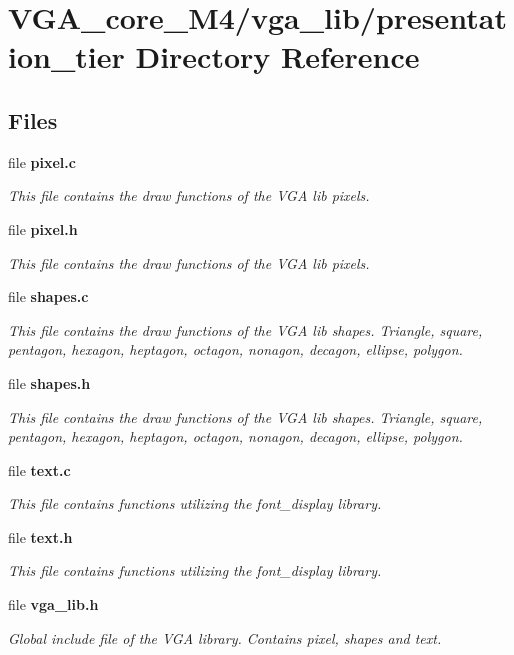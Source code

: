 \section{V\+G\+A\+\_\+core\+\_\+\+M4/vga\+\_\+lib/presentation\+\_\+tier Directory Reference}
\label{dir_4530e91959babd00a8d42e18034e9737}
\subsection*{Files}
\begin{DoxyCompactItemize}
\item 
file {\bf pixel.\+c}
\begin{DoxyCompactList}\small\item\em This file contains the draw functions of the V\+GA lib pixels. \end{DoxyCompactList}\item 
file {\bf pixel.\+h}
\begin{DoxyCompactList}\small\item\em This file contains the draw functions of the V\+GA lib pixels. \end{DoxyCompactList}\item 
file {\bf shapes.\+c}
\begin{DoxyCompactList}\small\item\em This file contains the draw functions of the V\+GA lib shapes. Triangle, square, pentagon, hexagon, heptagon, octagon, nonagon, decagon, ellipse, polygon. \end{DoxyCompactList}\item 
file {\bf shapes.\+h}
\begin{DoxyCompactList}\small\item\em This file contains the draw functions of the V\+GA lib shapes. Triangle, square, pentagon, hexagon, heptagon, octagon, nonagon, decagon, ellipse, polygon. \end{DoxyCompactList}\item 
file {\bf text.\+c}
\begin{DoxyCompactList}\small\item\em This file contains functions utilizing the font\+\_\+display library. \end{DoxyCompactList}\item 
file {\bf text.\+h}
\begin{DoxyCompactList}\small\item\em This file contains functions utilizing the font\+\_\+display library. \end{DoxyCompactList}\item 
file {\bf vga\+\_\+lib.\+h}
\begin{DoxyCompactList}\small\item\em Global include file of the V\+GA library. Contains pixel, shapes and text. \end{DoxyCompactList}\end{DoxyCompactItemize}
